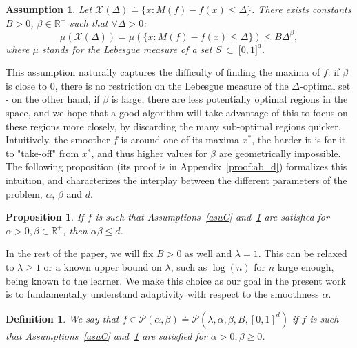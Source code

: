 \documentclass[final,12pt]{colt2018}
\newtheorem{asu}{Assumption}
\newtheorem{prop}{Proposition}
\newtheorem{defi}{Definition}
\begin{document}
\begin{asu}\label{asuT}
Let $\mathcal X(\Delta) \doteq \{x: M(f) - f(x) \leq \Delta\}$. There exists constants $B>0$, $\beta \in \mathbb{R}^+$ such that $\forall \Delta > 0$:
$$
\mu(\mathcal X(\Delta)) = \mu\left(\{x: M(f) - f(x) \leq \Delta\}\right) \leq B \Delta^\beta,
$$
where $\mu$ stands for the Lebesgue measure of a set $S~\subset~\mathbb [0,1]^d$.
\end{asu}
This assumption naturally captures the difficulty of finding the maxima of $f$: if $\beta$ is close to $0$, there is no restriction on the Lebesgue measure of the $\Delta$-optimal set - on the other hand, if $\beta$ is large, there are less potentially optimal regions in the space, and we hope that a good algorithm will take advantage of this to focus on these regions more closely, by discarding the many sub-optimal regions quicker.\\
Intuitively, the smoother $f$ is around one of its maxima $x^*$, the harder it is for it to "take-off" from $x^*$, and thus higher values for $\beta$ are geometrically impossible. The following proposition (its proof is in Appendix~\ref{proof:ab_d}) formalizes this intuition, and characterizes the interplay between the different parameters of the problem, $\alpha$, $\beta$ and $d$.

\begin{prop}\label{prop:ab_d}
If $f$ is such that Assumptions~\ref{asuC} and~\ref{asuT} are satisfied for $\alpha > 0, \beta \in \mathbb{R}^+$, then $\alpha\beta \leq d$.
\end{prop}

In the rest of the paper, we will fix $B > 0$ as well and $\lambda = 1$. This can be relaxed to $\lambda \geq 1$ or a known upper bound on $\lambda$, such as $\log(n)$ for $n$ large enough, being known to the learner. We make this choice as our goal in the present work is to fundamentally understand adaptivity with respect to the smoothness $\alpha$.

\begin{defi}\label{def_class}
We say that $f \in \mathcal{P}(\alpha, \beta) \doteq \mathcal{P}(\lambda, \alpha, \beta, B, [0,1]^d)$ if $f$ is such that Assumptions~\ref{asuC} and~\ref{asuT} are satisfied for $\alpha > 0, \beta \geq 0$.
\end{defi}
\end{document}
